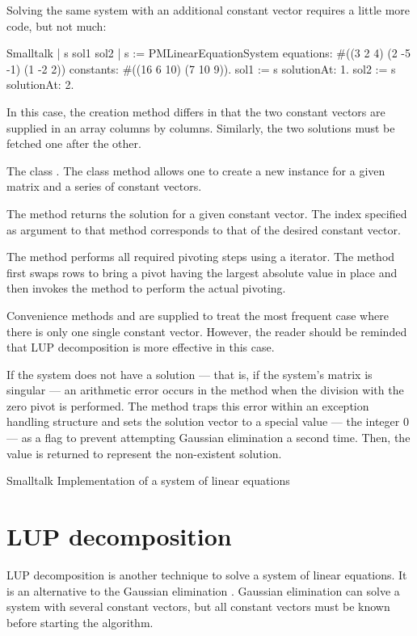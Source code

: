 Solving the same system with an additional constant vector
requires a little more code, but not much:
\begin{displaycode}{Smalltalk}
 | s sol1 sol2 |
 s := PMLinearEquationSystem equations: #((3 2 4) (2 -5 -1) (1 -2 2))
                        constants: #((16 6 10)
                                     (7 10 9)).
 sol1 := s solutionAt: 1.
 sol2 := s solutionAt: 2.
\end{displaycode}
In this case, the creation method differs in that the two constant
vectors are supplied in an array columns by columns. Similarly,
the two solutions must be fetched one after the other.

The class .
The class method  allows one to create a new instance for a given
matrix and a series of constant vectors.

The method  returns the solution for a given
constant vector. The index specified as argument to that method
corresponds to that of the desired constant vector.


The method  performs all required pivoting steps using
a  iterator. The method  first swaps
rows to bring a pivot having the largest absolute value in place
and then invokes the method  to perform the actual
pivoting.

Convenience methods  and 
are supplied to treat the most frequent case where there is only
one single constant vector. However, the reader should be reminded
that LUP decomposition is more effective in this case.

If the system does not have a solution --- that is, if the
system's matrix is singular --- an arithmetic error occurs in the
method  when the division with the zero pivot is
performed. The method  traps this error within an
exception handling structure and sets the solution vector to a
special value --- the integer 0 --- as a flag to prevent
attempting Gaussian elimination a second time. Then, the value
 is returned to represent the non-existent solution.

\begin{listing}[label=lst:lineqs]{Smalltalk}
{Implementation of a system of linear equations}
%
\end{listing}

\section{LUP decomposition}
\label{sec:lup} LUP decomposition is another technique to solve a
system of linear equations. It is an alternative to the Gaussian
elimination \cite{CorLeiRiv}. Gaussian elimination can solve a
system with several constant vectors, but all constant vectors
must be known before starting the algorithm.

